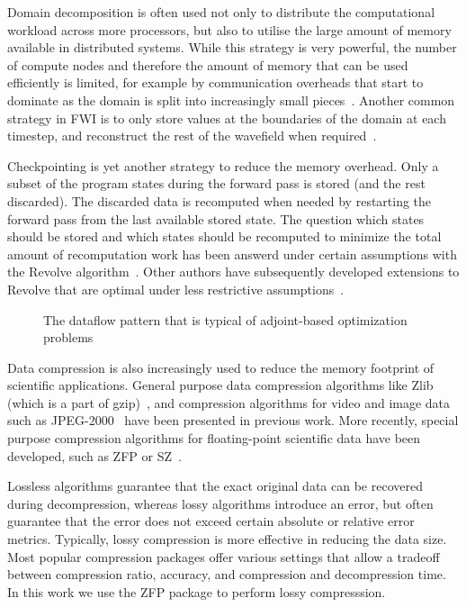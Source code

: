 \documentclass[conference]{IEEEtran}
\begin{document}
Domain decomposition is often used not only to distribute the computational
workload across more processors, but also to utilise the large amount of memory
available in distributed systems. While this strategy is very powerful, the
number of compute nodes and therefore the amount of memory that can be used
efficiently is limited, for example by communication overheads that start to
dominate as the domain is split into increasingly small
pieces~\cite{virieux2009seismic}.
Another common strategy in FWI is to only store values at the boundaries of the
domain at each timestep, and reconstruct the rest of the wavefield when
required~\cite{clapp2009reverse,yang2014rtm}.

Checkpointing is yet another strategy to reduce the memory overhead. Only a
subset of the program states during the forward pass is stored (and the rest
discarded).  The discarded data is recomputed when needed by restarting the
forward pass from the last available stored state. The question which states
should be stored and which states should be recomputed to minimize the total
amount of recomputation work has been answerd under certain assumptions with the
Revolve algorithm~\cite{griewank2000algorithm}.  Other authors have subsequently
developed extensions to Revolve that are optimal under less restrictive
assumptions~\cite{wang2009minimal,aupy2016optimal,schanen2016asynchronous}.

\begin{figure}
\begin{center}

\end{center}
\caption{The dataflow pattern that is typical of adjoint-based optimization problems}
\label{fig:dataflow}
\end{figure}

Data compression is also increasingly used to reduce the memory footprint of
scientific applications. General purpose data compression algorithms like Zlib
(which is a part of gzip)~\cite{deutsch1996zlib}, and compression algorithms for
video and image data such as JPEG-2000~\cite{skodras2001jpeg} have been
presented in previous work. More recently, special purpose compression
algorithms for floating-point scientific data have been developed, such as ZFP
or SZ~\cite{Kaklamanis:2012aa,lindstrom2014fixed,di2018efficient}.

Lossless algorithms guarantee that the exact original data can be recovered
during decompression, whereas lossy algorithms introduce an error, but often
guarantee that the error does not exceed certain absolute or relative error
metrics. Typically, lossy compression is more effective in reducing the data
size. Most popular compression packages offer various settings that allow a
tradeoff between compression ratio, accuracy, and compression and decompression
time. In this work we use the ZFP package to perform lossy compresssion.
\end{document}
